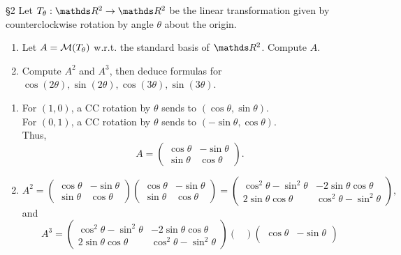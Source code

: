 \documentclass{review-sheet}
\begin{document}
\begin{problem}{\S 2}
  Let $T_\theta:\R^2\to \R^2$ be the linear transformation given by counterclockwise rotation by
  angle $\theta$ about the origin.
  \begin{enumerate}[label=(\alph*)]
    \item Let $A=\mathcal{M}(T_\theta)$ w.r.t. the standard basis of $\R^2$. Compute $A$.
    \item Compute $A^2$ and $A^3$, then deduce formulas for $
      \cos{(2\theta)},\sin{(2\theta)},\cos{(3\theta)},\sin{(3\theta)}$.
  \end{enumerate}
\end{problem}

\begin{solution}
  \begin{enumerate}[label=(\alph*)]
    \item For $(1,0)$, a CC rotation by $ \theta$ sends to $(\cos{\theta},\sin{\theta})$.\\
      For $(0,1)$, a CC rotation by $ \theta$ sends to $(-\sin{\theta},\cos{\theta})$.\\
      Thus, \[
        A = \begin{pmatrix} \cos{\theta}&-\sin{\theta}\\ \sin{\theta}&\cos{\theta} \end{pmatrix}
      .\]
    \item \[
        A^2 = \begin{pmatrix} \cos{\theta}&-\sin{\theta}\\ \sin{\theta}&\cos{\theta} \end{pmatrix}
        \begin{pmatrix} \cos{\theta}&-\sin{\theta}\\ \sin{\theta}&\cos{\theta} \end{pmatrix}
        =\begin{pmatrix} \cos^2{\theta}-\sin^2{\theta}
        &-2\sin{\theta}\cos{\theta}\\2\sin{\theta}\cos{\theta}&\cos^2{\theta}-\sin^2{\theta}\end{pmatrix} 
      ,\] and \[
        A^3=\begin{pmatrix} \cos^2{\theta}-\sin^2{\theta}
        &-2\sin{\theta}\cos{\theta}\\2\sin{\theta}\cos{\theta}&\cos^2{\theta}-\sin^2{\theta}\end{pmatrix}
        \begin{pmatrix}  \end{pmatrix} \begin{pmatrix} \cos{\theta}&-\sin{\theta}\\

\end{pmatrix}\]
\end{enumerate}
\end{solution}
\end{document}
